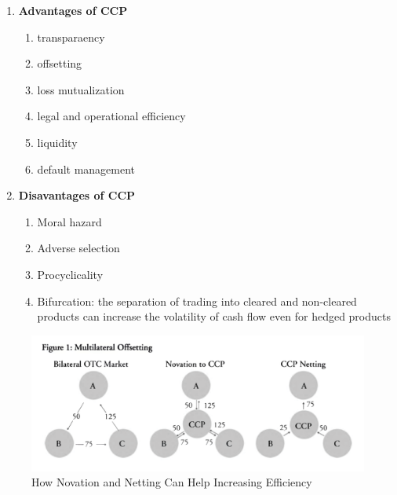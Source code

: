 \documentclass[11pt,fleqn]{book} %
\numberwithin{equation}{section} %
\numberwithin{figure}{section} %
\numberwithin{table}{section} %
\begin{document}
 \begin{definition}
    \begin{enumerate}
        \item \textbf{Advantages of CCP}
        \begin{enumerate}
            \item transparaency
            \item offsetting
            \item loss mutualization
            \item legal and operational efficiency
            \item liquidity
            \item default management
        \end{enumerate}
        \item \textbf{Disavantages of CCP}
        \begin{enumerate}
            \item Moral hazard
            \item Adverse selection
            \item Procyclicality
            \item Bifurcation: the separation of trading into cleared and non-cleared
            products can increase the volatility of cash flow even for hedged products
        \end{enumerate}
    \end{enumerate}
 \end{definition}
 \begin{figure}[h!]
    \begin{center}
        \includegraphics[scale=0.7]{clearing.png}
        \caption{How Novation and Netting Can Help Increasing Efficiency}
    \end{center}
 \end{figure}
\end{document}
